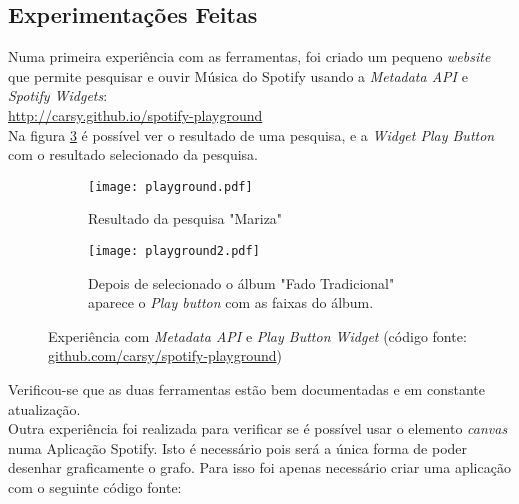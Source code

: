 
  \subsection{Experimentações Feitas} %
  \label{sub:experimentacoes}
  
    Numa primeira experiência com as ferramentas, foi criado um pequeno \emph{website} que permite pesquisar e ouvir Música do Spotify usando a \emph{Metadata API} e \emph{Spotify Widgets}: \\

    \url{http://carsy.github.io/spotify-playground} \\

    Na figura \ref{fig:playground} é possível ver o resultado de uma pesquisa, e a \emph{Widget Play Button} com o resultado selecionado da pesquisa.

    \begin{figure}
      \centering

      \begin{subfigure}[b]{0.38\textwidth}
        \texttt{[image: playground.pdf]}
        \caption{Resultado da pesquisa "Mariza"}
        \label{fig:playgroun_a}
      \end{subfigure}

      \begin{subfigure}[b]{0.38\textwidth}
        \texttt{[image: playground2.pdf]}
        \caption{Depois de selecionado o álbum "Fado Tradicional" aparece o \emph{Play button} com as faixas do álbum.}
        \label{fig:playground_b}
      \end{subfigure}

      \caption{Experiência com \emph{Metadata API} e \emph{Play Button Widget} (código fonte: \url{github.com/carsy/spotify-playground})}
      \label{fig:playground}

    \end{figure}

    Verificou-se que as duas ferramentas estão bem documentadas e em constante atualização. \\

    Outra experiência foi realizada para verificar se é possível usar o elemento \emph{canvas} numa Aplicação Spotify.
    Isto é necessário pois será a única forma de poder desenhar graficamente o grafo.
    Para isso foi apenas necessário criar uma aplicação com o seguinte código fonte:

